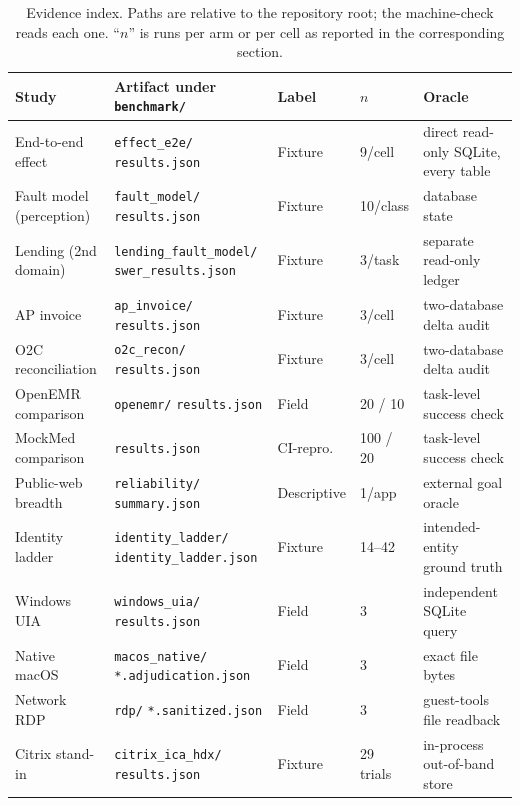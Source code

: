 \begin{table}[t]
\centering
\caption{Evidence index. Paths are relative to the repository root; the
machine-check reads each one. ``$n$'' is runs per arm or per cell as reported in
the corresponding section.}
\label{tab:evidence}
\footnotesize
\setlength{\tabcolsep}{4pt}
\begin{tabular}{L{27mm}L{42mm}L{18mm}L{13mm}L{40mm}}
\toprule
Study & Artifact under \texttt{benchmark/} & Label & $n$ & Oracle \\
\midrule
End-to-end effect & \texttt{effect\_e2e/} \texttt{results.json} & Fixture & 9/cell & direct read-only SQLite, every table \\
Fault model (perception) & \texttt{fault\_model/} \texttt{results.json} & Fixture & 10/class & database state \\
Lending (2nd domain) & \texttt{lending\_fault\_model/} \texttt{swer\_results.json} & Fixture & 3/task & separate read-only ledger \\
AP invoice & \texttt{ap\_invoice/} \texttt{results.json} & Fixture & 3/cell & two-database delta audit \\
O2C reconciliation & \texttt{o2c\_recon/} \texttt{results.json} & Fixture & 3/cell & two-database delta audit \\
OpenEMR comparison & \texttt{openemr/} \texttt{results.json} & Field & 20 / 10 & task-level success check \\
MockMed comparison & \texttt{results.json} & CI-repro. & 100 / 20 & task-level success check \\
Public-web breadth & \texttt{reliability/} \texttt{summary.json} & Descriptive & 1/app & external goal oracle \\
Identity ladder & \texttt{identity\_ladder/} \texttt{identity\_ladder.json} & Fixture & 14--42 & intended-entity ground truth \\
Windows UIA & \texttt{windows\_uia/} \texttt{results.json} & Field & 3 & independent SQLite query \\
Native macOS & \texttt{macos\_native/} \texttt{*.adjudication.json} & Field & 3 & exact file bytes \\
Network RDP & \texttt{rdp/} \texttt{*.sanitized.json} & Field & 3 & guest-tools file readback \\
Citrix stand-in & \texttt{citrix\_ica\_hdx/} \texttt{results.json} & Fixture & 29 trials & in-process out-of-band store \\
\bottomrule
\end{tabular}
\end{table}

